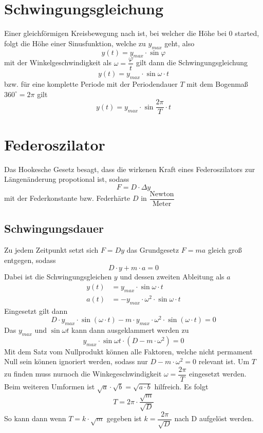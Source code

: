 \documentclass{article}
\begin{document}
\section{Schwingungsgleichung}
Einer gleichförmigen Kreisbewegung nach ist, bei welcher die Höhe bei $0$ started, folgt die Höhe einer Sinusfunktion, welche zu $y_{max}$ geht, also
\[
 y(t)=y_{max} \cdot \sin{\varphi}
\]
mit der Winkelgeschwindigkeit als $\omega = \dfrac{\varphi}{t}$ gilt dann die Schwingungsgleichung
\[
 \boxed{y(t)=y_{max} \cdot \sin{\omega \cdot t}}
\]
bzw. für eine komplette Periode mit der Periodendauer $T$ mit dem Bogenmaß $360^\circ = 2\pi$ gilt
\[
 \boxed{y(t)=y_{max} \cdot \sin{\frac{2\pi}{T} \cdot t}} 
\]
 
\section{Federoszilator}
Das Hookesche Gesetz besagt, dass die wirkenen Kraft eines Federoszilators zur Längenänderung propotional ist, sodass
\[
 F = D \cdot \Delta y
\]
mit der Federkonstante bzw. Federhärte $D$ in $\dfrac{\text{Newton}}{\text{Meter}}$
 
\subsection{Schwingungsdauer}
Zu jedem Zeitpunkt setzt sich $F=Dy$ das Grundgesetz $F=ma$ gleich groß entgegen, sodass
\begin{equation}
 D \cdot y + m \cdot a = 0
\end{equation}
Dabei ist die Schwingungsgleichen $y$ und dessen zweiten Ableitung als $a$
\begin{align}
y(t)&=y_{max} \cdot \sin{\omega \cdot t} \\
a(t)&=-y_{max} \cdot \omega^2 \cdot \sin{\omega \cdot t}
\end{align} 
Eingesetzt gilt dann 
\begin{equation}
 D \cdot y_{max} \cdot \sin{(\omega \cdot t)} - m \cdot y_{max} \cdot \omega^2 \cdot \sin{(\omega \cdot t)} = 0
\end{equation} 
Das $y_{max}$ und $\sin{\omega t}$ kann dann ausgeklammert werden zu \begin{equation}
 y_{max} \cdot \sin{\omega t} \cdot (D - m \cdot \omega^2) = 0 
\end{equation} 
Mit dem Satz vom Nullprodukt können alle Faktoren, welche nicht permament Null sein können ignoriert werden, sodass nur $D - m \cdot \omega^2 = 0$ relevant ist. \newline
Um $T$ zu finden muss nurnoch die Winkegeschwindigkeit $\omega = \dfrac{2\pi}{T}$ eingesetzt werden. Beim weiteren Umformen ist $\sqrt{a}\cdot\sqrt{b}=\sqrt{a \cdot b}$ hilfreich. 
Es folgt 
\begin{equation}
 T = 2\pi \cdot \frac{\sqrt{m}}{\sqrt{D}}
\end{equation} 
So kann dann wenn $T=k \cdot \sqrt{m}$ gegeben ist $k=\dfrac{2\pi}{\sqrt{D}}$ nach D aufgelöst werden. 
 
\end{document}

